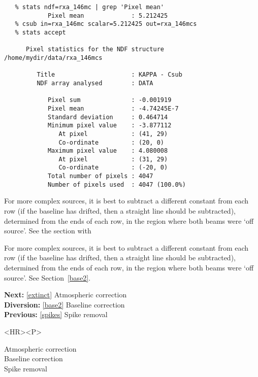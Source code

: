 \begin{verbatim}
   % stats ndf=rxa_146mc | grep 'Pixel mean'
            Pixel mean             : 5.212425
   % csub in=rxa_146mc scalar=5.212425 out=rxa_146mcs
   % stats accept

      Pixel statistics for the NDF structure /home/mydir/data/rxa_146mcs

         Title                     : KAPPA - Csub
         NDF array analysed        : DATA

            Pixel sum              : -0.001919
            Pixel mean             : -4.74245E-7
            Standard deviation     : 0.464714
            Minimum pixel value    : -3.877112
               At pixel            : (41, 29)
               Co-ordinate         : (20, 0)
            Maximum pixel value    : 4.080008
               At pixel            : (31, 29)
               Co-ordinate         : (-20, 0)
            Total number of pixels : 4047
            Number of pixels used  : 4047 (100.0%)
\end{verbatim}

\begin{htmlonly}
   For more complex sources, it is best 
   to subtract a different constant from each row (if the baseline has
   drifted, then a straight line should be subtracted), determined from
   the ends of each row, in the region where both beams were `off source'.
   See the section with
\end{htmlonly}
\begin{latexonly}
   For more complex sources, it is best 
   to subtract a different constant from each row (if the baseline has
   drifted, then a straight line should be subtracted), determined from
   the ends of each row, in the region where both beams were `off source'.
   See
Section~\ref{base2}.
\end{latexonly}

\begin{latexonly}
{\bf Next:} \ref{extinct} Atmospheric correction\\
{\bf Diversion:} \ref{base2} Baseline correction\\
{\bf Previous:} \ref{spikes} Spike removal\\
\end{latexonly}

\begin{htmlonly}
\begin{rawhtml} <HR><P> \end{rawhtml}
{\bf {}} Atmospheric correction\\
{\bf {}} Baseline correction\\
{\bf {}} Spike removal\\
{\bf {}}\\
{\bf {}}\\
\end{htmlonly}


